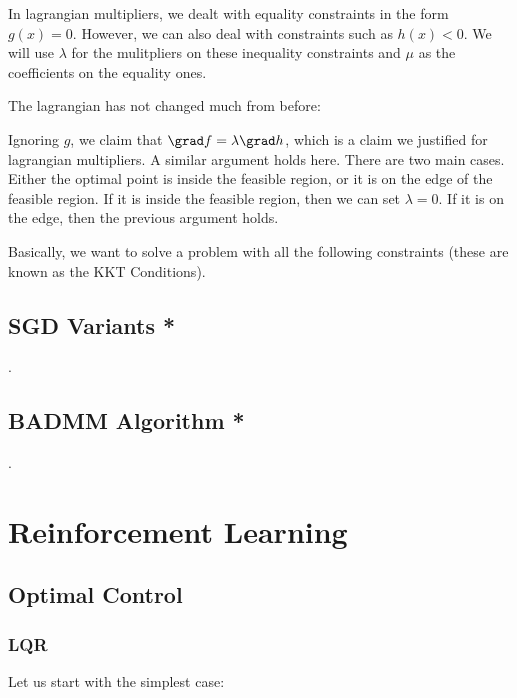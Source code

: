 \documentclass[12pt]{article}
\begin{document}
In lagrangian multipliers, we dealt with equality constraints in the form $g(x) = 0$. However, we can also deal with constraints such as $h(x) < 0$. We will use $\lambda$ for the mulitpliers on these inequality constraints and $\mu$ as the coefficients on the equality ones.

The lagrangian has not changed much from before:


Ignoring $g$, we claim that $\grad f = \lambda \grad h$, which is a claim we justified for lagrangian multipliers. A similar argument holds here. There are two main cases. Either the optimal point is inside the feasible region, or it is on the edge of the feasible region. If it is inside the feasible region, then we can set $\lambda = 0$. If it is on the edge, then the previous argument holds.

Basically, we want to solve a problem with all the following constraints (these are known as the KKT Conditions). 


\subsection{SGD Variants *}
.
\subsection{BADMM Algorithm *}
.
\section{Reinforcement Learning}

\subsection{Optimal Control}

\subsubsection{LQR}

Let us start with the simplest case:

\end{document}
